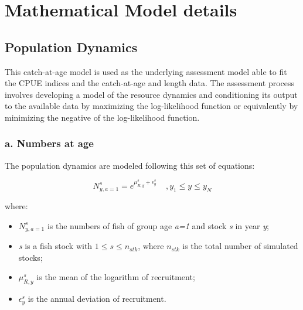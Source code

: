 \documentclass{article}
\begin{document}
\section{Mathematical Model details}
\subsection{Population Dynamics}
This catch-at-age model is used as the underlying assessment model able to fit the CPUE indices and the catch-at-age and length data. The assessment process involves developing a model of the resource dynamics and conditioning its output to the available data by maximizing the log-likelihood function or equivalently by minimizing the negative of the log-likelihood function.


\subsubsection{a. Numbers at age} \label{N}

The population dynamics are modeled following this set of equations:


\begin{equation}
N^s_{y,a=1}=e^{\mu_{R,y}^s+\epsilon_{y}^s}  \ \ \ \ \ , y_{1}\leq y \leq y_{N}
\end{equation}

where:
\begin{itemize}
    \item $N^s_{y,a=1}$ is the numbers of fish of group age \textit{a=1} and stock \textit{s} in year \textit{y};
    
    \item \textit{s} is a fish stock with $1\leq s \leq n_{stk}$, where $n_{stk}$ is the total number of simulated stocks; 
    
    \item $\mu_{R,y}^s$ is the mean  of the logarithm of recruitment;

    \item $\epsilon_{y}^s$ is the annual deviation of recruitment.
    
\end{itemize}
\end{document}
